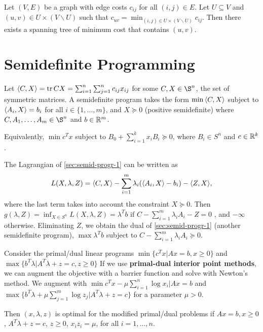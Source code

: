 \begin{thm}
  \label{sec:short-paths-minim-3}
  Let $(V, E)$ be a graph with edge costs $c_{ij}$ for all $(i, j) \in
  E$. Let $U \subseteq V$ and $(u, v) \in U \times (V \backslash U)$
  such that $c_{uv} = \min_{(i, j) \in U \times (V \backslash U)}
  c_{ij}$. Then there exists a spanning tree of minimum cost that
  contains $(u, v)$.
\end{thm}

\section{Semidefinite Programming}
\label{sec:semid-progr}

\begin{defn}
  \label{sec:semid-progr-1}
  Let $\IP{C, X} = \tr CX = \sum_{i=1}^{n} \sum_{j=1}^{n} c_{ij}
  x_{ij}$ for some $C, X \in \S^{n}$, the set of symmetric matrices.
  A semidefinite program takes the form $\min \IP{C, X}$ subject to
  $\IP{A_{i}, X} = b_{i}$ for all $i \in \{ 1, \dots, m \} $, and $X
  \succeq 0$ (positive semidefinite) where $C, A_{1}, \dots, A_{m} \in
  \S^{n}$ and $b \in \mathbb{R}^{m}$.

Equivalently, $\min c^{T} x$ subject to $B_{0} + \sum_{i=1}^{k} x_{i}
B_{i} \succeq 0$, where $B_{i} \in S^{n}$ and $c \in \mathbb{R}^{k}$.
\end{defn}

\begin{thm}
  \label{sec:semid-progr-2}
  The Lagrangian of \ref{sec:semid-progr-1} can be written as
  \begin{equation}
    \label{eq:13}
    L(X, \lambda, Z) = \IP{C, X} - \sum_{i=1}^{m} \lambda_{i}
    (\IP{A_{i}, X} - b_{i}) - \IP{Z, X},
  \end{equation} where the last term takes into account the constraint
  $X \succeq 0$. Then $g(\lambda, Z) = \inf_{X \in S^{n}} L(X,
  \lambda, Z) = \lambda^{T} b$ if $C - \sum_{i=1}^{m} \lambda_{i}
  A_{i} - Z = 0$ , and $-\infty$ otherwise.  Eliminating $Z$, we
  obtain the dual of \ref{sec:semid-progr-1} (another semidefinite
  program), $\max \lambda^{T} b$ subject to $C - \sum_{i=1}^{m}
  \lambda_{i} A_{i} \succeq 0$.
\end{thm}

\begin{thm}
  \label{sec:semid-progr-3}
  Consider the primal/dual linear programs $\min \{ c^{T} x | Ax = b,
  x \geq 0 \} $ and $\max \{ b^{T} \lambda | A^{T} \lambda +z = c, z
  \geq 0 \} $  If we use \textbf{primal-dual interior point methods},
  we can augment the objective with a barrier function and solve with
  Newton's method.  We augment with $\min c^{T} x - \mu \sum_{i=1}^{n}
  \log x_{i} | Ax = b$ and $\max \{ b^{T} \lambda + \mu \sum_{j=1}^{m}
  \log z_{j} | A^{T} \lambda + z = c \} $ for a parameter $\mu > 0$.

  Then $(x, \lambda, z)$ is optimal for the modified primal/dual
  problems if $Ax = b, x \geq 0$, $A^{T} \lambda + z = c$, $z \geq 0$,
  $x_{i} z_{i} = \mu$, for all $i = 1, \dots, n$.
\end{thm}

